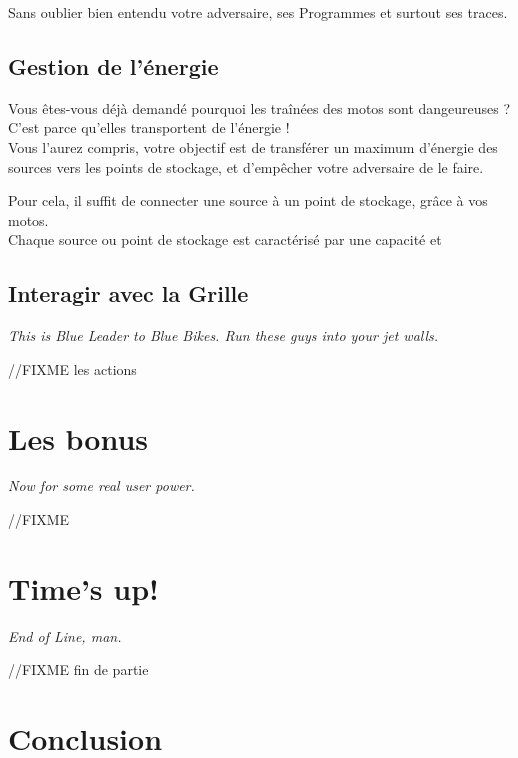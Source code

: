 Sans oublier bien entendu votre adversaire, ses Programmes et surtout
ses traces.\\

\subsection{Gestion de l'énergie}
Vous êtes-vous déjà demandé pourquoi les traînées des motos sont
dangeureuses ? C'est parce qu'elles transportent de l'énergie !\\

Vous l'aurez compris, votre objectif est de transférer un maximum
d'énergie des sources vers les points de stockage, et d'empêcher votre
adversaire de le faire.

Pour cela, il suffit de connecter une source à un point de stockage,
grâce à vos motos.\\

Chaque source ou point de stockage est caractérisé par une capacité et

        \subsection{Interagir avec la Grille}
        \emph{This is Blue Leader to Blue Bikes. Run these guys into your jet walls.}

        //FIXME les actions


\newpage
\section{Les bonus} \label{section-bonus}
\emph{Now for some real user power.}

//FIXME

\newpage
\section{Time's up!}
\emph{End of Line, man.}

//FIXME fin de partie

\newpage
\section{Conclusion}
